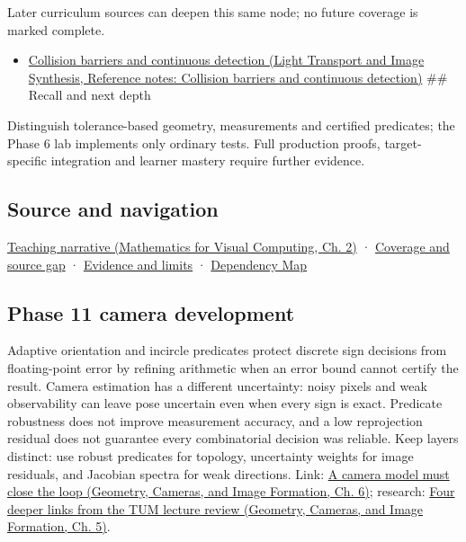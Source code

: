 Later curriculum sources can deepen this same node; no future coverage is marked complete.

\begin{itemize}
\tightlist
\item
  \href{../04-Light-Transport-and-Image-Synthesis/main.pdf\#nameddest=appendix-a9ba01fa72a6}{Collision barriers and continuous detection (Light Transport and Image Synthesis, Reference notes: Collision barriers and continuous detection)} \#\# Recall and next depth
\end{itemize}

Distinguish tolerance-based geometry, measurements and certified predicates; the Phase 6 lab implements only ordinary tests. Full production proofs, target-specific integration and learner mastery require further evidence.

\subsection{Source and navigation}\label{appendix-341296fb3f64-source-and-navigation}

\href{../02-Mathematics-for-Visual-Computing/main.pdf\#nameddest=01-foundations-i-ch018-the-sensor-needs-coordinates-inside-the-triangle}{Teaching narrative (Mathematics for Visual Computing, Ch. 2)} · \hyperref[appendix-fd090d982a15-phase-6---parts-501-600]{Coverage and source gap} · \hyperref[appendix-a103e7846d21-phase-6---source-analysis-and-verification]{Evidence and limits} · \hyperref[appendix-4ad47bdd269a]{Dependency Map}

\subsection{Phase 11 camera development}\label{appendix-341296fb3f64-phase-11-camera-development}

Adaptive orientation and incircle predicates protect discrete sign decisions from floating-point error by refining arithmetic when an error bound cannot certify the result. Camera estimation has a different uncertainty: noisy pixels and weak observability can leave pose uncertain even when every sign is exact. Predicate robustness does not improve measurement accuracy, and a low reprojection residual does not guarantee every combinatorial decision was reliable. Keep layers distinct: use robust predicates for topology, uncertainty weights for image residuals, and Jacobian spectra for weak directions. Link: \href{../03-Geometry-Cameras-and-Image-Formation/main.pdf\#nameddest=02-foundations-ii-ch037-a-camera-model-must-close-the-loop}{A camera model must close the loop (Geometry, Cameras, and Image Formation, Ch. 6)}; research: \href{../03-Geometry-Cameras-and-Image-Formation/main.pdf\#nameddest=02-foundations-ii-ch036-four-deeper-links-from-the-tum-lecture-review}{Four deeper links from the TUM lecture review (Geometry, Cameras, and Image Formation, Ch. 5)}.
